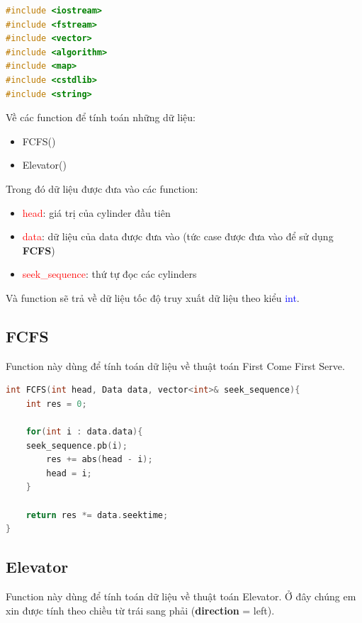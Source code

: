 \documentclass{report}
\begin{document}
        \begin{lstlisting}[language=C++, caption=Libraries]
#include <iostream>
#include <fstream>
#include <vector>
#include <algorithm>
#include <map>
#include <cstdlib>
#include <string>
        \end{lstlisting}

        Về các function để tính toán những dữ liệu:
        \begin{itemize}
            \item FCFS()
            \item Elevator()
        \end{itemize}

        Trong đó dữ liệu được đưa vào các function:
            \begin{itemize}
                \item \textcolor{red}{head}: giá trị của cylinder đầu tiên
                \item \textcolor{red}{data}: dữ liệu của data được đưa vào (tức case được đưa vào để sử dụng \textbf{FCFS})
                \item \textcolor{red}{seek\_sequence}: thứ tự đọc các cylinders
            \end{itemize}

        
        Và function sẽ trả về dữ liệu tốc độ truy xuất dữ liệu theo kiểu \textcolor{blue}{int}.
            

        \subsection{FCFS}
            Function này dùng để tính toán dữ liệu về thuật toán First Come First Serve.

            \begin{lstlisting}[language=C++,caption=FCFS implementation]
int FCFS(int head, Data data, vector<int>& seek_sequence){
    int res = 0;

    for(int i : data.data){
	seek_sequence.pb(i);
        res += abs(head - i);
        head = i;
    }
    
    return res *= data.seektime;
}
            \end{lstlisting}

        \subsection{Elevator}
            Function này dùng để tính toán dữ liệu về thuật toán Elevator. Ở đây chúng em xin được tính theo chiều từ trái sang phải (\textbf{direction} = left).
\end{document}
